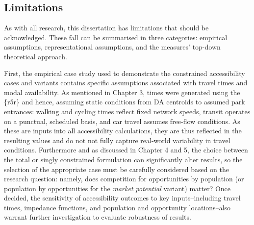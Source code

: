 \documentclass[
11pt, %
oneside, %
english, %
singlespacing, %
]{macthesis} %
\begin{document}
\subsection{Limitations}\label{limitations}

As with all research, this dissertation has limitations that should be acknowledged. These fall can be summarised in three categories: empirical assumptions, representational assumptions, and the measures' top-down theoretical approach.

First, the empirical case study used to demonstrate the constrained accessibility cases and variants contains specific assumptions associated with travel times and modal availability. As mentioned in Chapter 3, times were generated using the \{r5r\} and hence, assuming static conditions from DA centroids to assumed park entrances: walking and cycling times reflect fixed network speeds, transit operates on a punctual, scheduled basis, and car travel assumes free-flow conditions. As these are inputs into all accessibility calculations, they are thus reflected in the resulting values and do not not fully capture real-world variability in travel conditions. Furthermore and as discussed in Chapter 4 and 5, the choice between the total or singly constrained formulation can significantly alter results, so the selection of the appropriate case must be carefully considered based on the research question: namely, does competition for opportunities by population (or population by opportunities for the \emph{market potential} variant) matter? Once decided, the sensitivity of accessibility outcomes to key inputs--including travel times, impedance functions, and population and opportunity locations--also warrant further investigation to evaluate robustness of results.
\end{document}
